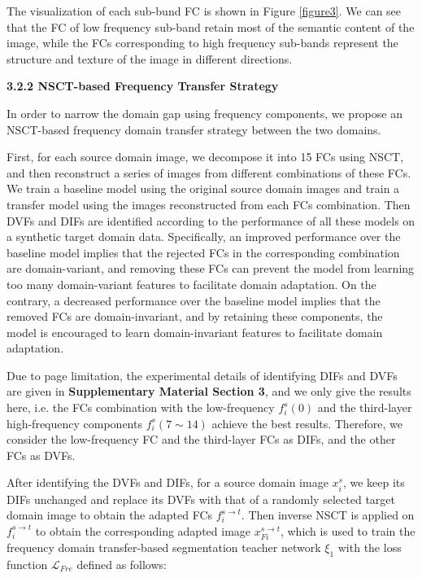 \documentclass[letterpaper]{article} %
\begin{document}
The visualization of each sub-bund FC is shown in Figure \ref{figure3}. We can see that the FC of low frequency sub-band retain
most of the semantic content of the image, while the FCs corresponding to high frequency sub-bands represent the
structure and texture of the image in different directions.

\noindent \textbf{3.2.2 NSCT-based Frequency Transfer Strategy}

\noindent In order to narrow the domain gap using frequency components, we propose an NSCT-based frequency domain transfer
strategy between the two domains.

First, for each source domain image, we decompose it into 15 FCs using NSCT, and then reconstruct a series of images
from different combinations of these FCs. We train a baseline model using the original source domain images and train
a transfer model using the images reconstructed from each FCs combination. Then DVFs and DIFs are identified according
to the performance of all these models on a synthetic target domain data. Specifically, an improved performance over
the baseline model implies that the rejected FCs in the corresponding combination are domain-variant, and removing
these FCs can prevent the model from learning too many domain-variant features to facilitate domain adaptation.
On the contrary, a decreased performance over the baseline model implies that the removed FCs
are domain-invariant, and by retaining these components, the model is encouraged to learn domain-invariant features to
facilitate domain adaptation.

Due to page limitation, the experimental details of identifying DIFs and DVFs are given in \textbf{Supplementary Material Section 3},
and we only give the results here, i.e. the FCs combination with the low-frequency $f_i^s (0)$ and the third-layer high-frequency
components $f_i^s (7\sim 14)$ achieve the best results. Therefore, we consider the low-frequency FC and the third-layer FCs as DIFs, and
the other FCs as DVFs.

After identifying the DVFs and DIFs, for a source domain image $x_i^s$, we keep its DIFs unchanged and replace its
DVFs with that of a randomly selected target domain image to obtain the adapted FCs $f_{i}^{s\to{t}}$. Then inverse NSCT
is applied on $f_{i}^{s\to{t}}$ to obtain the corresponding adapted image $x_{Fi}^{s\to{t}}$, which is used to train the frequency
domain transfer-based segmentation teacher network $\xi_1$ with the loss function $ \mathcal{L}_{Fre}$  defined as follows:
\end{document}
